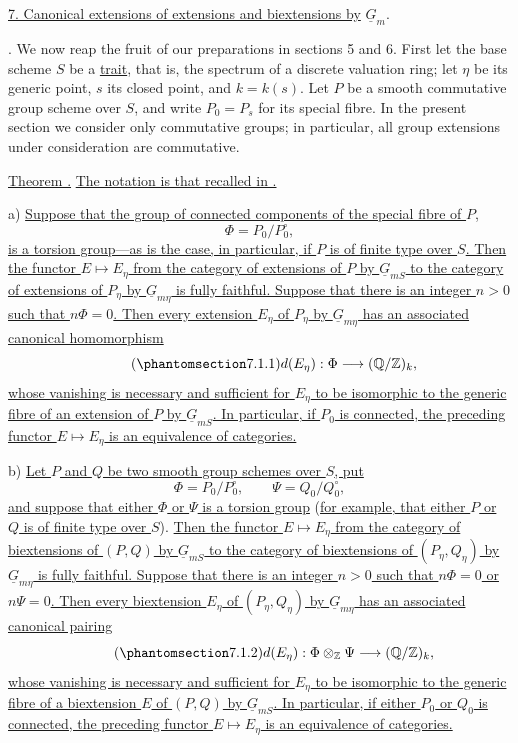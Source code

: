 
\medskip
\noindent\underline{7.  Canonical extensions of extensions and
biextensions by} $\underline G_m$.

\medskip
\noindent {}.  We now reap the fruit of our preparations in sections 5 and
6.  First let the base scheme $S$ be a \underline{trait}, that is, the
spectrum of a discrete valuation ring; let $\eta$ be its generic point,
$s$ its closed point, and $k=k(s)$.  Let $P$ be a smooth commutative group
scheme over $S$, and write $P_0=P_s$ for its special fibre.  In the present
section we consider only commutative groups; in particular, all group
extensions under consideration are commutative.

\medskip
\noindent\underline{Theorem .}  \underline{The notation is that recalled
in .}

\smallskip
\noindent a) \underline{Suppose that the group of connected components of
the special fibre of $P$,}
\[
 \Phi=P_0/P_0^{\circ},
\]
\underline{is a torsion group---as is the case, in particular, if $P$ is of
finite type over $S$.  Then the functor $E\mapsto E_\eta$ from the category
of extensions of $P$ by $\underline G_{mS}$ to the category of extensions
of $P_\eta$ by $\underline G_{m\eta}$ is fully faithful.  Suppose that there
is an integer $n>0$ such that $n\Phi=0$.  Then every extension $E_\eta$ of
$P_\eta$ by $\underline G_{m\eta}$ has an associated canonical
homomorphism}
\begin{equation}\tag{\SGARefTarget{sga7.sga7i.eviii.n7-1-1}{7.1.1}}
 d(E_\eta):\Phi\longrightarrow(\mathbb Q/\mathbb Z)_k,
\end{equation}
\underline{whose vanishing is necessary and sufficient for $E_\eta$ to be
isomorphic to the generic fibre of an extension of $P$ by
$\underline G_{mS}$.  In particular, if $P_0$ is connected, the preceding
functor $E\mapsto E_\eta$ is an equivalence of categories.}

\smallskip
\noindent b) \underline{Let $P$ and $Q$ be two smooth group schemes over
$S$, put}
\[
 \Phi=P_0/P_0^{\circ},\qquad \Psi=Q_0/Q_0^{\circ},
\]
\underline{and suppose that either $\Phi$ or $\Psi$ is a torsion group} (\underline{for
example, that either $P$ or $Q$ is of finite type over $S$}).  \underline{Then the
functor $E\mapsto E_\eta$ from the category of biextensions of $(P,Q)$ by
$\underline G_{mS}$ to the category of biextensions of
$(P_\eta,Q_\eta)$ by $\underline G_{m\eta}$ is fully faithful.  Suppose that
there is an integer $n>0$ such that $n\Phi=0$ or $n\Psi=0$.  Then every
biextension $E_\eta$ of $(P_\eta,Q_\eta)$ by $\underline G_{m\eta}$ has an
associated canonical pairing}
\begin{equation}\tag{\SGARefTarget{sga7.sga7i.eviii.n7-1-2}{7.1.2}}
 d(E_\eta):\Phi\otimes_{\mathbb Z}\Psi
 \longrightarrow(\mathbb Q/\mathbb Z)_k,
\end{equation}
\underline{whose vanishing is necessary and sufficient for $E_\eta$ to be
isomorphic to the generic fibre of a biextension $E$ of $(P,Q)$ by
$\underline G_{mS}$.  In particular, if either $P_0$ or $Q_0$ is connected,
the preceding functor $E\mapsto E_\eta$ is an equivalence of categories.}

